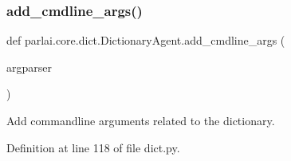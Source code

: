 \subsubsection{\texorpdfstring{add\+\_\+cmdline\+\_\+args()}{add\_cmdline\_args()}}
{\footnotesize\ttfamily def parlai.\+core.\+dict.\+Dictionary\+Agent.\+add\+\_\+cmdline\+\_\+args (\begin{DoxyParamCaption}\item[{}]{argparser }\end{DoxyParamCaption})\hspace{0.3cm}{\ttfamily [static]}}

\begin{DoxyVerb}Add commandline arguments related to the dictionary.
\end{DoxyVerb}
 

Definition at line 118 of file dict.\+py.


